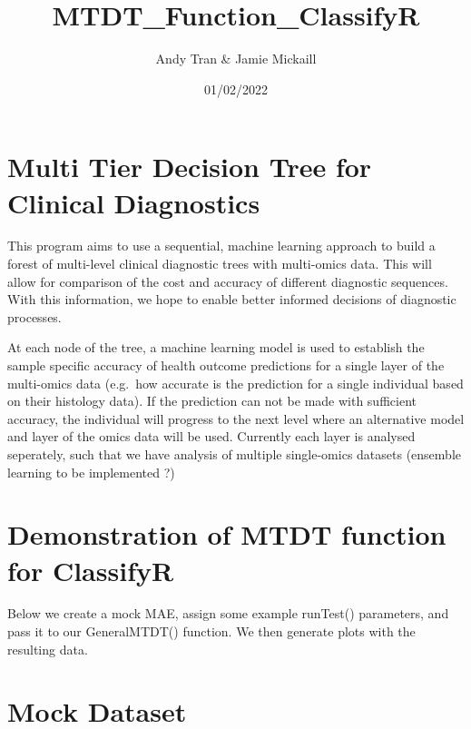 \documentclass[
]{article}
\title{MTDT\_Function\_ClassifyR}
\author{Andy Tran \& Jamie Mickaill}
\date{01/02/2022}
\begin{document}
\maketitle

\hypertarget{multi-tier-decision-tree-for-clinical-diagnostics}{%
\section{Multi Tier Decision Tree for Clinical
Diagnostics}\label{multi-tier-decision-tree-for-clinical-diagnostics}}

This program aims to use a sequential, machine learning approach to
build a forest of multi-level clinical diagnostic trees with multi-omics
data. This will allow for comparison of the cost and accuracy of
different diagnostic sequences. With this information, we hope to enable
better informed decisions of diagnostic processes.

At each node of the tree, a machine learning model is used to establish
the sample specific accuracy of health outcome predictions for a single
layer of the multi-omics data (e.g.~how accurate is the prediction for a
single individual based on their histology data). If the prediction can
not be made with sufficient accuracy, the individual will progress to
the next level where an alternative model and layer of the omics data
will be used. Currently each layer is analysed seperately, such that we
have analysis of multiple single-omics datasets (ensemble learning to be
implemented ?)

\hypertarget{demonstration-of-mtdt-function-for-classifyr}{%
\section{Demonstration of MTDT function for
ClassifyR}\label{demonstration-of-mtdt-function-for-classifyr}}

Below we create a mock MAE, assign some example runTest() parameters,
and pass it to our GeneralMTDT() function. We then generate plots with
the resulting data.

\hypertarget{mock-dataset}{%
\section{Mock Dataset}\label{mock-dataset}}
\end{document}
